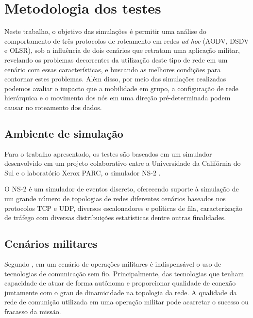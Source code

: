 \section{Metodologia dos testes}\label{metodologia}
Neste trabalho, o objetivo das simula\c{c}\~oes \'e permitir uma an\'alise do comportamento de tr\^es protocolos de roteamento em redes \textit{ad hoc} (AODV, DSDV e OLSR), sob a influ\^encia de dois cen\'arios que retratam uma aplica\c{c}\~ao militar, revelando os problemas decorrentes da utiliza\c{c}\~ao deste tipo de rede em um cen\'ario com essas caracter\'isticas, e buscando as melhores condi\c{c}\~oes para contornar estes problemas. 
Al\'em disso, por meio das simula\c{c}\~oes realizadas podemos avaliar o impacto que a mobilidade em grupo, a configura\c{c}\~ao de rede hier\'arquica e o movimento dos n\'os em uma dire\c{c}\~ao pr\'e-determinada podem causar no roteamento dos dados.

\subsection{Ambiente de simula\c{c}\~ ao}
Para o trabalho apresentado, os testes s\~ao baseados em um simulador desenvolvido em um projeto colaborativo entre a Universidade da Calif\'ornia do Sul e o laborat\'orio Xerox PARC, o simulador NS-2 \cite{FallVaradhan}.

O NS-2 \'e um simulador de eventos discreto, oferecendo suporte \`a simula\c{c}\~ao de um grande n\'umero de topologias de redes diferentes cen\'arios baseados nos protocolos TCP e UDP, diversos escalonadores e pol\'iticas de fila, caracteriza\c{c}\~ao de tr\'afego com diversas distribui\c{c}\~oes estat\'isticas dentre outras finalidades.

\subsection{Cen\'arios militares}
Segundo \cite{pereira}, em um cen\'ario de opera\c{c}\~oes militares \'e indispens\'avel o uso de tecnologias de comunica\c{c}\~ao sem fio. 
Principalmente, das tecnologias que tenham capacidade de atuar de forma aut\^onoma e proporcionar qualidade de conex\~ao juntamente com o grau de dinamicidade na topologia da rede.
A qualidade da rede de comuni\c{c}\~ao utilizada em uma opera\c{c}\~ao militar pode acarretar o sucesso ou fracasso da miss\~ao.


